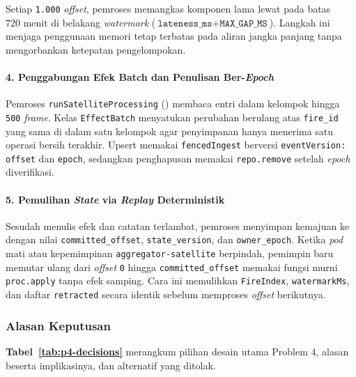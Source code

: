 Setiap \texttt{1.000} \textit{offset}, pemroses memangkas komponen lama lewat  pada batas $720\text{ menit}$ di belakang \textit{watermark} ($\texttt{lateness\_ms} + \texttt{MAX\_GAP\_MS}$). Langkah ini menjaga penggunaan memori tetap terbatas pada aliran jangka panjang tanpa mengorbankan ketepatan pengelompokan.

\paragraph*{4. Penggabungan Efek Batch dan Penulisan Ber-\textit{Epoch}}
Pemroses \texttt{run\allowbreak Satellite\allowbreak Processing} () membaca entri  dalam kelompok hingga \texttt{500} \textit{frame}. Kelas \texttt{EffectBatch} menyatukan perubahan berulang atas \texttt{fire\_id} yang sama di dalam satu kelompok agar penyimpanan hanya menerima satu operasi bersih terakhir. Upsert memakai \texttt{fencedIngest} berversi \texttt{eventVersion:} \texttt{offset} dan \texttt{epoch}, sedangkan penghapusan memakai \texttt{repo.remove} setelah \textit{epoch} diverifikasi.

\paragraph*{5. Pemulihan \textit{State} via \textit{Replay} Deterministik}
Sesudah menulis efek dan catatan terlambat, pemroses menyimpan kemajuan ke  dengan nilai \texttt{committed\_offset}, \texttt{state\_version}, dan \texttt{owner\_epoch}. Ketika \textit{pod} mati atau kepemimpinan \texttt{aggregator-satellite} berpindah, pemimpin baru memutar ulang  dari \textit{offset} \texttt{0} hingga \texttt{committed\_offset} memakai fungsi murni \texttt{proc.apply} tanpa efek samping. Cara ini memulihkan \texttt{FireIndex}, \texttt{watermarkMs}, dan daftar \texttt{retracted} secara identik sebelum memproses \textit{offset} berikutnya.

\subsubsection{Alasan Keputusan}

\textbf{Tabel~\ref{tab:p4-decisions}} merangkum pilihan desain utama Problem 4, alasan beserta implikasinya, dan alternatif yang ditolak.

